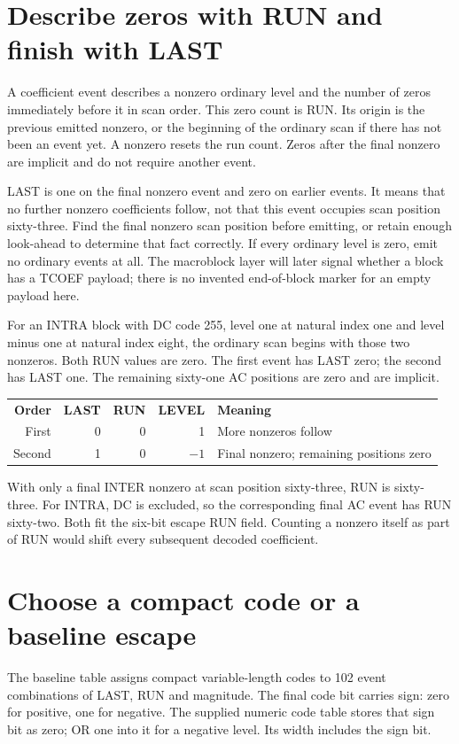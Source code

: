 \section{Describe zeros with RUN and finish with LAST}
A coefficient event describes a nonzero ordinary level and the number of zeros
immediately before it in scan order. This zero count is RUN. Its origin is the
previous emitted nonzero, or the beginning of the ordinary scan if there has
not been an event yet. A nonzero resets the run count. Zeros after the final
nonzero are implicit and do not require another event.

LAST is one on the final nonzero event and zero on earlier events. It means
that no further nonzero coefficients follow, not that this event occupies scan
position sixty-three. Find the final nonzero scan position before emitting, or
retain enough look-ahead to determine that fact correctly. If every ordinary
level is zero, emit no ordinary events at all. The macroblock layer will later
signal whether a block has a TCOEF payload; there is no invented end-of-block
marker for an empty payload here.

For an INTRA block with DC code 255, level one at natural index one and level
minus one at natural index eight, the ordinary scan begins with those two
nonzeros. Both RUN values are zero. The first event has LAST zero; the second
has LAST one. The remaining sixty-one AC positions are zero and are implicit.

\begin{center}
  \begin{tabular}{rrrrl}
    \textbf{Order} & \textbf{LAST} & \textbf{RUN} & \textbf{LEVEL} & \textbf{Meaning}                        \\
    First          & 0             & 0            & 1              & More nonzeros follow                    \\
    Second         & 1             & 0            & $-1$           & Final nonzero; remaining positions zero
  \end{tabular}
\end{center}
With only a final INTER nonzero at scan position sixty-three, RUN is sixty-three.
For INTRA, DC is excluded, so the corresponding final AC event has RUN sixty-two.
Both fit the six-bit escape RUN field. Counting a nonzero itself as part of RUN
would shift every subsequent decoded coefficient.

\section{Choose a compact code or a baseline escape}
The baseline table assigns compact variable-length codes to 102 event combinations
of LAST, RUN and magnitude. The final code bit carries sign: zero for positive,
one for negative. The supplied numeric code table stores that sign bit as zero;
OR one into it for a negative level. Its width includes the sign bit.

